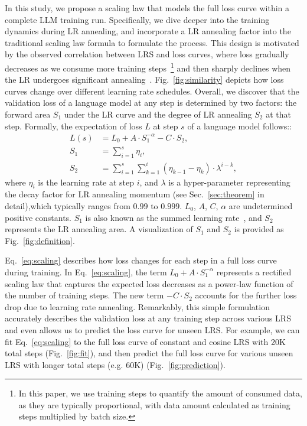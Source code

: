 In this study, we propose a scaling law that models the full loss curve within a complete LLM training run. 
Specifically, we dive deeper into the training dynamics during LR annealing, and incorporate a LR annealing factor into the traditional scaling law formula to formulate the process.
This design is motivated by the observed correlation between LRS and loss curves, where loss gradually decreases as we consume more training steps~\footnote{In this paper, we use training steps to quantify the amount of consumed data, as they are typically proportional, with data amount calculated as training steps multiplied by batch size.} and then sharply declines when the LR undergoes significant annealing~\citep{loshchilov2016sgdr,dontdecay,simple-scalable-cpt2024,hu2024minicpm}. 
Fig.~\ref{fig:similarity} depicts how loss curves change over different learning rate schedules.
Overall, we discover that the validation loss of a language model at any step is determined by two factors: the forward area $S_1$ under the LR curve and the degree of LR annealing $S_2$ at that step. Formally, the expectation of loss $L$ at step $s$ of a language model follows::
\begin{equation}
\label{eq:scaling}
\begin{aligned}
L(s) &= L_0 + A\cdot S_1^{-\alpha} - C\cdot S_2, \\
S_1 &= \sum\limits_{i=1}^{s}\eta_i, \\
S_2 &= \sum\limits_{i=1}^{s}\sum\limits_{k=1}^{i}(\eta_{k-1} - \eta_{k})\cdot \lambda^{i-k},
\end{aligned}
\end{equation}
where $\eta_i$ is the learning rate at step $i$, and $\lambda$ is a hyper-parameter representing the decay factor for LR annealing momentum (see Sec.~\ref{sec:theorem} in detail),which typically ranges from $0.99$ to $0.999$. $L_0$, $A$, $C$, $\alpha$ are undetermined positive constants. $S_1$ is also known as the summed learning rate~\citep{kaplan2020scaling}, and $S_2$ represents the LR annealing area. A visualization of $S_1$ and $S_2$ is provided as Fig.~\ref{fig:definition}. 

Eq.~\ref{eq:scaling} describes how loss changes for each step in a full loss curve during training. In Eq.~\ref{eq:scaling}, the term $L_0 + A\cdot S_1^{-\alpha}$ represents a rectified scaling law that captures the expected loss decreases as a power-law function of the number of training steps. The new term $-C\cdot S_2$ accounts for the further loss drop due to learning rate annealing. Remarkably, this simple formulation accurately describes the validation loss at any training step across various LRS and even allows us to predict the loss curve for unseen LRS. For example, we can fit Eq.~\ref{eq:scaling} to the full loss curve of constant and cosine LRS with 20K total steps (Fig.~\ref{fig:fit}), and then predict the full loss curve for various unseen LRS with longer total steps (e.g. 60K) (Fig.~\ref{fig:prediction}).

